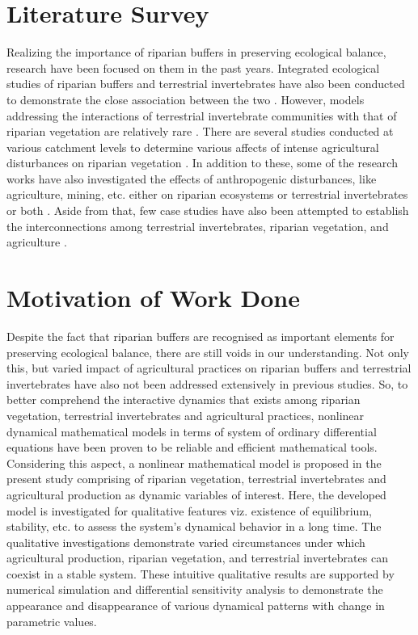 \documentclass[12pt,a4wide]{report}
\numberwithin{equation}{chapter}
\numberwithin{theorem}{chapter}
\begin{document}
\section{Literature Survey}
Realizing the importance of riparian buffers in preserving ecological balance, research have been focused on them in the past years. Integrated ecological studies of riparian buffers and terrestrial invertebrates have also been conducted to demonstrate the close association between the two \citep{forio2020small, flory1999, kawaguchi2001}. However, models addressing the interactions of terrestrial invertebrate communities with that of riparian vegetation are relatively rare \citep{steward2022, wipfli1997, sabo2002}. There are several studies conducted at various catchment levels to determine various affects of intense agricultural disturbances on riparian vegetation \citep{cesarini2022riparian,alemu2018identifying, heartsill2003riparian, corbacho2003patterns, schlosser1981riparian}. In addition to these, some of the research works have also investigated the effects of anthropogenic disturbances, like agriculture, mining, etc. either on riparian ecosystems or terrestrial invertebrates or both \citep{you2015, burdon2020}. Aside from that, few case studies have also been attempted to establish the interconnections among terrestrial invertebrates, riparian vegetation, and agriculture \citep{popescu2021riparian, delong1998, connolly2016, moore2005}.\\
\section{Motivation of Work Done}
Despite the fact that riparian buffers are recognised as important elements for preserving ecological balance, there are still voids in our understanding. Not only this, but varied impact of agricultural practices on riparian buffers and terrestrial invertebrates have also not been addressed extensively in previous studies. So, to better comprehend the interactive dynamics that exists among riparian vegetation, terrestrial invertebrates and agricultural practices, nonlinear dynamical mathematical models in terms of system of ordinary differential equations have been proven to be reliable and efficient mathematical tools.  Considering this aspect, a nonlinear mathematical model is proposed in the present study comprising of riparian vegetation, terrestrial invertebrates and agricultural production as dynamic variables of interest. Here, the developed model is investigated for qualitative features viz. existence of equilibrium, stability, etc. to assess the system's dynamical behavior in a long time. The qualitative investigations demonstrate varied circumstances under which agricultural production, riparian vegetation, and terrestrial invertebrates can coexist in a stable system. These intuitive qualitative results are supported by numerical simulation and differential sensitivity analysis to demonstrate the appearance and disappearance of various dynamical patterns with change in parametric values.\\
\end{document}
